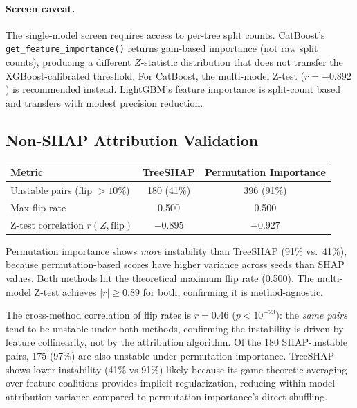 \documentclass{article}
\begin{document}
\paragraph{Screen caveat.}
\begin{sloppypar}
The single-model screen requires access to per-tree split counts.
CatBoost's \texttt{get\_feature\_importance()} returns gain-based importance
(not raw split counts), producing a different $Z$-statistic distribution that
does not transfer the XGBoost-calibrated threshold. For CatBoost, the multi-model
Z-test ($r = -0.892$) is recommended instead. LightGBM's feature
importance is split-count based and transfers with modest precision reduction.
\end{sloppypar}

\subsection{Non-SHAP Attribution Validation}

\begin{center}
\small
\begin{tabular}{@{}lcc@{}}
\toprule
Metric & TreeSHAP & Permutation Importance \\
\midrule
Unstable pairs (flip $>10\%$) & 180 (41\%) & 396 (91\%) \\
Max flip rate & 0.500 & 0.500 \\
Z-test correlation $r(Z, \text{flip})$ & $-0.895$ & $-0.927$ \\
\bottomrule
\end{tabular}
\end{center}

Permutation importance shows \emph{more} instability than TreeSHAP (91\% vs.\ 41\%), because permutation-based scores have higher variance across seeds than SHAP values. Both methods hit the theoretical maximum flip rate (0.500). The multi-model Z-test achieves $|r| \geq 0.89$ for both, confirming it is method-agnostic.

The cross-method correlation of flip rates is $r = 0.46$ ($p < 10^{-23}$): the \emph{same pairs} tend to be unstable under both methods, confirming the instability is driven by feature collinearity, not by the attribution algorithm. Of the 180 SHAP-unstable pairs, 175 (97\%) are also unstable under permutation importance. TreeSHAP shows lower instability (41\% vs 91\%) likely because its game-theoretic averaging over feature coalitions provides implicit regularization, reducing within-model attribution variance compared to permutation importance's direct shuffling.
\end{document}
